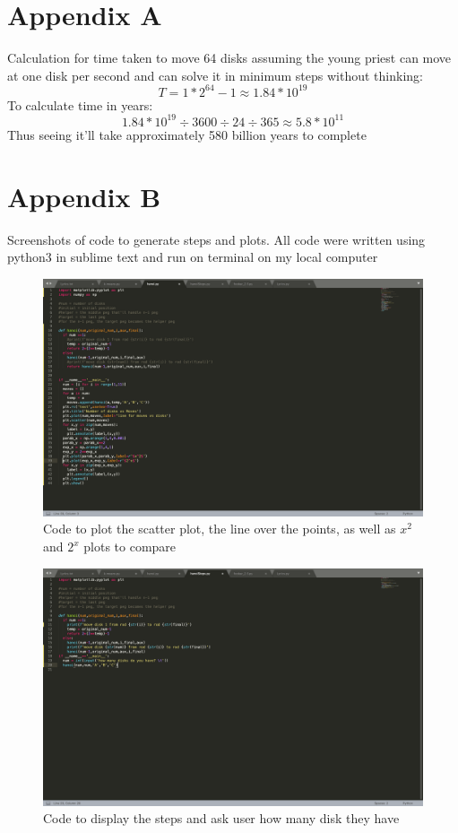 \documentclass[12pt,a4paper]{article}
\begin{document}
	\section{Appendix A}
	Calculation for time taken to move 64 disks assuming the young priest can move at one disk per second and can solve it in minimum steps without thinking:
	\begin{equation}
	    T = 1*2^{64} -1 \approx 1.84*10^{19}
	\end{equation}
	To calculate time in years:
	\begin{equation}
	    1.84*10^{19} \div 3600 \div 24 \div 365 \approx 5.8*10^{11}
	\end{equation}
	Thus seeing it'll take approximately 580 billion years to complete
	\section{Appendix B}
	Screenshots of code to generate steps and plots. All code were written using python3 in sublime text and run on terminal on my local computer\newpage
	\begin{figure}
	    \includegraphics[width=\linewidth]{code_plot.png}
	    \caption{Code to plot the scatter plot, the line over the points, as well as $x^2$ and $2^x$ plots to compare}
	\end{figure}
	\begin{figure}
	    \centering
	    \includegraphics[width=\linewidth]{hanoi.png}
	    \caption{Code to display the steps and ask user how many disk they have}
	\end{figure}
\end{document}
